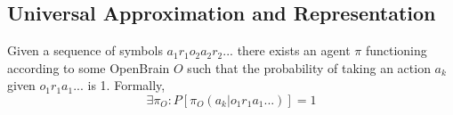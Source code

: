 \subsection{Universal Approximation and Representation}


\begin{conjecture}
Given a sequence of symbols $a_1r_1o_2a_2r_2...$ there exists an agent $\pi$ functioning according to some OpenBrain $O$ such that the probability of taking an action $a_k$ given $o_1r_1a_1...$ is 1. Formally, 
$$\exists \pi_{O} : P[\pi_{O}(a_k|o_1r_1a_1...)] = 1$$ 
\end{conjecture}